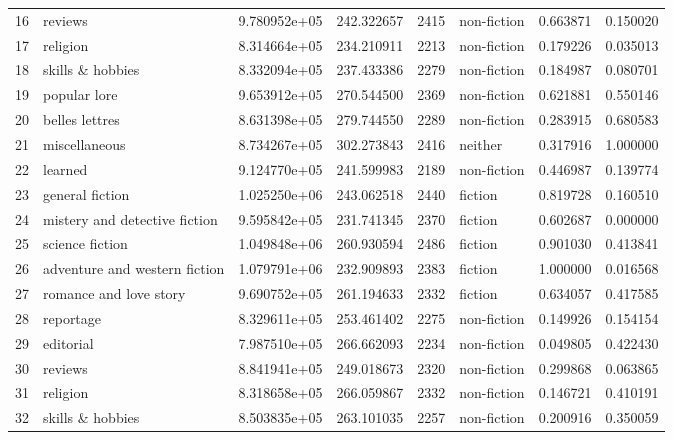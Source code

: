 \documentclass[12pt,letterpaper,twoside]{article}
\begin{document}
\begin{landscape}
\begin{longtable}{llrrrlrr}
16 &                        reviews &  9.780952e+05 &  242.322657 &  2415 &   non-fiction &    0.663871 &     0.150020 \\
17 &                       religion &  8.314664e+05 &  234.210911 &  2213 &   non-fiction &    0.179226 &     0.035013 \\
18 &               skills \& hobbies &  8.332094e+05 &  237.433386 &  2279 &   non-fiction &    0.184987 &     0.080701 \\
19 &                   popular lore &  9.653912e+05 &  270.544500 &  2369 &   non-fiction &    0.621881 &     0.550146 \\
20 &                 belles lettres &  8.631398e+05 &  279.744550 &  2289 &   non-fiction &    0.283915 &     0.680583 \\
21 &                  miscellaneous &  8.734267e+05 &  302.273843 &  2416 &       neither &    0.317916 &     1.000000 \\
22 &                        learned &  9.124770e+05 &  241.599983 &  2189 &   non-fiction &    0.446987 &     0.139774 \\
23 &                general fiction &  1.025250e+06 &  243.062518 &  2440 &       fiction &    0.819728 &     0.160510 \\
24 &  mistery and detective fiction &  9.595842e+05 &  231.741345 &  2370 &       fiction &    0.602687 &     0.000000 \\
25 &                science fiction &  1.049848e+06 &  260.930594 &  2486 &       fiction &    0.901030 &     0.413841 \\
26 &  adventure and western fiction &  1.079791e+06 &  232.909893 &  2383 &       fiction &    1.000000 &     0.016568 \\
27 &         romance and love story &  9.690752e+05 &  261.194633 &  2332 &       fiction &    0.634057 &     0.417585 \\
28 &                      reportage &  8.329611e+05 &  253.461402 &  2275 &   non-fiction &    0.149926 &     0.154154 \\
29 &                      editorial &  7.987510e+05 &  266.662093 &  2234 &   non-fiction &    0.049805 &     0.422430 \\
30 &                        reviews &  8.841941e+05 &  249.018673 &  2320 &   non-fiction &    0.299868 &     0.063865 \\
31 &                       religion &  8.318658e+05 &  266.059867 &  2332 &   non-fiction &    0.146721 &     0.410191 \\
32 &               skills \& hobbies &  8.503835e+05 &  263.101035 &  2257 &   non-fiction &    0.200916 &     0.350059 \\

\end{longtable}
\end{landscape}
\end{document}
